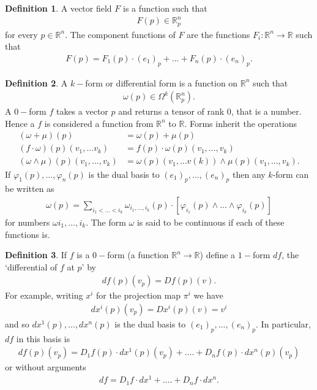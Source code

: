 \documentclass[20pt]{article}
\theoremstyle{plain}
\theoremstyle{definition}
\newtheorem{definition}{Definition}
\newcommand{\reals}{\mathbb{R}}
\begin{document}
\begin{definition}
  A vector field $F$ is a function such that
  \begin{align*}
    F(p) \in \reals^n_p
  \end{align*}
  for every $p \in \reals^n.$  The component functions of $F$ are the functions
  $F_i: \reals^n \to \reals$ such that
  \begin{align*}
    F(p) = F_1(p)\cdot(e_1)_p + ... + F_n(p)\cdot(e_n)_p.
  \end{align*}
\end{definition}

\begin{definition}
  A $k-$form or differential form is a function on $\reals^n$ such that
  \begin{align*}
    \omega(p) \in \Omega^k(\reals^n_p).
  \end{align*}
  A $0-$form $f$ takes a vector $p$ and returns a tensor of rank $0$, that is a number.
  Hence a $f$ is considered a function from $\reals^n$ to $\reals.$
  Forms inherit the operations
  \begin{align*}
    (\omega + \mu)(p) &= \omega(p) + \mu(p)\\
    (f \cdot \omega)(p)(v_1, ...v_k) &= f(p) \cdot \omega(p)(v_1, ..., v_k)\\
    (\omega \wedge \mu)(p)(v_1, ..., v_k) &= \omega(p)(v_1,...v(k)) \wedge \mu(p)(v_1, ..., v_k).
  \end{align*}
  If $\varphi_1(p), ..., \varphi_n(p)$ is the dual basis to $(e_1)_p, ..., (e_n)_p$ then any $k$-form can be written as
  \begin{align*}
    \omega(p) = \sum_{i_1<...<i_k} \omega_{i_1, ..., i_k}(p)\cdot[\varphi_{i_1}(p)\wedge...\wedge\varphi_{i_k}(p)]
  \end{align*}
  for numbers $\omega{i_1,...,i_k}$.  The form $\omega$ is said to be continuous if each of these functions is.

  \end{definition}

  \begin{definition}
    If $f$ is a $0-$form (a function $\reals^n \to \reals$) define a $1-$form $df$, the  `differential of $f$ at $p$' by
    \begin{align*}
      df(p)(v_p) = Df(p)(v).
    \end{align*}
    For example, writing $x^i$ for the projection map $\pi^i$ we have
    \begin{align*}
      dx^i(p)(v_p) = Dx^i(p)(v) = v^i
    \end{align*}
    and so $dx^1(p), ..., dx^n(p)$ is the dual basis to $(e_1)_p, ..., (e_n)_p.$
    In particular, $df$ in this basis is
    \begin{align*}
      df(p)(v_p) = D_1f(p) \cdot dx^1(p)(v_p) + .... + D_nf(p)\cdot dx^n(p)(v_p)
    \end{align*}
    or without arguments
    \begin{align*}
      df = D_1f\cdot dx^1 + .... + D_nf \cdot dx^n.
    \end{align*}
  \end{definition}
\end{document}
